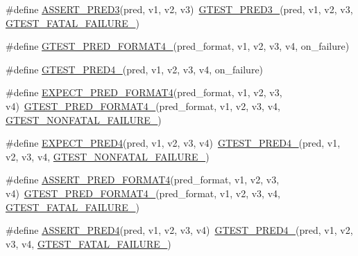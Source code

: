 \begin{DoxyCompactItemize}
\item 
\#define \hyperlink{fused-src_2gtest_2gtest_8h_aa7688f3ab9f09a2c1dbf13bd1f29d8fd}{\-A\-S\-S\-E\-R\-T\-\_\-\-P\-R\-E\-D3}(pred, v1, v2, v3)~\hyperlink{gtest__pred__impl_8h_af30518f03233bc4486b55284b0827eb8}{\-G\-T\-E\-S\-T\-\_\-\-P\-R\-E\-D3\-\_\-}(pred, v1, v2, v3, \hyperlink{gtest-internal_8h_a0f9a4c3ea82cc7bf4478eaffdc168358}{\-G\-T\-E\-S\-T\-\_\-\-F\-A\-T\-A\-L\-\_\-\-F\-A\-I\-L\-U\-R\-E\-\_\-})
\item 
\#define \hyperlink{fused-src_2gtest_2gtest_8h_abd207ed869491ba4bba29f8df37b7355}{\-G\-T\-E\-S\-T\-\_\-\-P\-R\-E\-D\-\_\-\-F\-O\-R\-M\-A\-T4\-\_\-}(pred\-\_\-format, v1, v2, v3, v4, on\-\_\-failure)
\item 
\#define \hyperlink{fused-src_2gtest_2gtest_8h_a14e8c70455104fac032efec097ef668b}{\-G\-T\-E\-S\-T\-\_\-\-P\-R\-E\-D4\-\_\-}(pred, v1, v2, v3, v4, on\-\_\-failure)
\item 
\#define \hyperlink{fused-src_2gtest_2gtest_8h_a3354347de0f2445400b509cf39dce1dc}{\-E\-X\-P\-E\-C\-T\-\_\-\-P\-R\-E\-D\-\_\-\-F\-O\-R\-M\-A\-T4}(pred\-\_\-format, v1, v2, v3, v4)~\hyperlink{gtest__pred__impl_8h_abd207ed869491ba4bba29f8df37b7355}{\-G\-T\-E\-S\-T\-\_\-\-P\-R\-E\-D\-\_\-\-F\-O\-R\-M\-A\-T4\-\_\-}(pred\-\_\-format, v1, v2, v3, v4, \hyperlink{gtest-internal_8h_a6cb7482cfa03661a91c698eb5895f642}{\-G\-T\-E\-S\-T\-\_\-\-N\-O\-N\-F\-A\-T\-A\-L\-\_\-\-F\-A\-I\-L\-U\-R\-E\-\_\-})
\item 
\#define \hyperlink{fused-src_2gtest_2gtest_8h_a4fd2b1bad63eb752bc2ff2b6bb3f4569}{\-E\-X\-P\-E\-C\-T\-\_\-\-P\-R\-E\-D4}(pred, v1, v2, v3, v4)~\hyperlink{gtest__pred__impl_8h_a14e8c70455104fac032efec097ef668b}{\-G\-T\-E\-S\-T\-\_\-\-P\-R\-E\-D4\-\_\-}(pred, v1, v2, v3, v4, \hyperlink{gtest-internal_8h_a6cb7482cfa03661a91c698eb5895f642}{\-G\-T\-E\-S\-T\-\_\-\-N\-O\-N\-F\-A\-T\-A\-L\-\_\-\-F\-A\-I\-L\-U\-R\-E\-\_\-})
\item 
\#define \hyperlink{fused-src_2gtest_2gtest_8h_a1842593c1dfb13c9a4b33b01540a8b40}{\-A\-S\-S\-E\-R\-T\-\_\-\-P\-R\-E\-D\-\_\-\-F\-O\-R\-M\-A\-T4}(pred\-\_\-format, v1, v2, v3, v4)~\hyperlink{gtest__pred__impl_8h_abd207ed869491ba4bba29f8df37b7355}{\-G\-T\-E\-S\-T\-\_\-\-P\-R\-E\-D\-\_\-\-F\-O\-R\-M\-A\-T4\-\_\-}(pred\-\_\-format, v1, v2, v3, v4, \hyperlink{gtest-internal_8h_a0f9a4c3ea82cc7bf4478eaffdc168358}{\-G\-T\-E\-S\-T\-\_\-\-F\-A\-T\-A\-L\-\_\-\-F\-A\-I\-L\-U\-R\-E\-\_\-})
\item 
\#define \hyperlink{fused-src_2gtest_2gtest_8h_addc030c521775610e4619a01541a2167}{\-A\-S\-S\-E\-R\-T\-\_\-\-P\-R\-E\-D4}(pred, v1, v2, v3, v4)~\hyperlink{gtest__pred__impl_8h_a14e8c70455104fac032efec097ef668b}{\-G\-T\-E\-S\-T\-\_\-\-P\-R\-E\-D4\-\_\-}(pred, v1, v2, v3, v4, \hyperlink{gtest-internal_8h_a0f9a4c3ea82cc7bf4478eaffdc168358}{\-G\-T\-E\-S\-T\-\_\-\-F\-A\-T\-A\-L\-\_\-\-F\-A\-I\-L\-U\-R\-E\-\_\-})

\end{DoxyCompactItemize}
